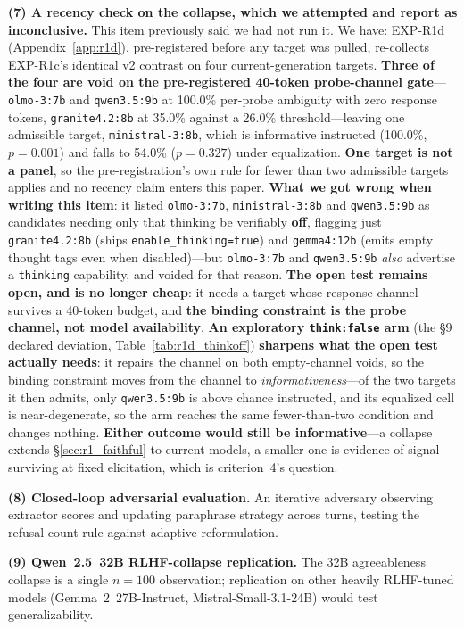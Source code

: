 \textbf{(7) A recency check on the collapse, which we attempted and report as inconclusive.} This item previously said we had not run it. We have: EXP-R1d (Appendix~\ref{app:r1d}), pre-registered before any target was pulled, re-collects EXP-R1c's identical v2 contrast on four current-generation targets. \textbf{Three of the four are void on the pre-registered 40-token probe-channel gate}---\texttt{olmo-3:7b} and \texttt{qwen3.5:9b} at 100.0\% per-probe ambiguity with zero response tokens, \texttt{granite4.2:8b} at 35.0\% against a 26.0\% threshold---leaving one admissible target, \texttt{ministral-3:8b}, which is informative instructed (100.0\%, $p=0.001$) and falls to 54.0\% ($p=0.327$) under equalization. \textbf{One target is not a panel}, so the pre-registration's own rule for fewer than two admissible targets applies and no recency claim enters this paper. \textbf{What we got wrong when writing this item}: it listed \texttt{olmo-3:7b}, \texttt{ministral-3:8b} and \texttt{qwen3.5:9b} as candidates needing only that thinking be verifiably \textbf{off}, flagging just \texttt{granite4.2:8b} (ships \texttt{enable\_thinking=true}) and \texttt{gemma4:12b} (emits empty thought tags even when disabled)---but \texttt{olmo-3:7b} and \texttt{qwen3.5:9b} \emph{also} advertise a \texttt{thinking} capability, and voided for that reason. \textbf{The open test remains open, and is no longer cheap}: it needs a target whose response channel survives a 40-token budget, and \textbf{the binding constraint is the probe channel, not model availability}. \textbf{An exploratory \texttt{think:false} arm} (the §9 declared deviation, Table~\ref{tab:r1d_thinkoff}) \textbf{sharpens what the open test actually needs}: it repairs the channel on both empty-channel voids, so the binding constraint moves from the channel to \emph{informativeness}---of the two targets it then admits, only \texttt{qwen3.5:9b} is above chance instructed, and its equalized cell is near-degenerate, so the arm reaches the same fewer-than-two condition and changes nothing. \textbf{Either outcome would still be informative}---a collapse extends §\ref{sec:r1_faithful} to current models, a smaller one is evidence of signal surviving at fixed elicitation, which is criterion~4's question.

\textbf{(8) Closed-loop adversarial evaluation.} An iterative adversary observing extractor scores and updating paraphrase strategy across turns, testing the refusal-count rule against adaptive reformulation.

\textbf{(9) Qwen~2.5~32B RLHF-collapse replication.} The 32B agreeableness collapse is a single $n=100$ observation; replication on other heavily RLHF-tuned models (Gemma~2~27B-Instruct, Mistral-Small-3.1-24B) would test generalizability.

